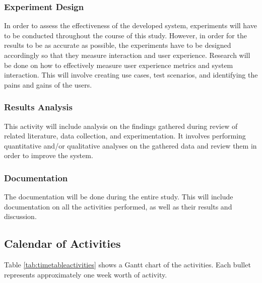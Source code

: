 \subsubsection{Experiment Design}
In order to assess the effectiveness of the developed system, experiments will have to be conducted throughout the course of this study. However, in order for the results to be as accurate as possible, the experiments have to be designed accordingly so that they measure interaction and user experience. Research will be done on how to effectively measure user experience metrics and system interaction. This will involve creating use cases, test scenarios, and identifying the pains and gains of the users.

\subsubsection{Results Analysis}
This activity will include analysis on the findings gathered during review of related literature, data collection, and experimentation. It involves performing quantitative and/or qualitative analyses on the gathered data and review them in order to improve the system. 

\subsubsection{Documentation}
The documentation will be done during the entire study. This will include documentation on all the activities performed, as well as their results and discussion.

\subsection{Calendar of Activities}
Table \ref{tab:timetableactivities} shows a Gantt chart of the activities.  Each bullet represents approximately
one week worth of activity.

%
%
\newcommand{\weekone}{\textbullet}
\newcommand{\weektwo}{\textbullet \textbullet}
\newcommand{\weekthree}{\textbullet \textbullet \textbullet}
\newcommand{\weekfour}{\textbullet \textbullet \textbullet \textbullet}

%
%
\begin{comment}
   \newcommand{\weekone}{$\star$}
   \newcommand{\weektwo}{$\star \star$}
   \newcommand{\weekthree}{$\star \star \star$}
   \newcommand{\weekfour}{$\star \star \star \star$ }
\end{comment}

